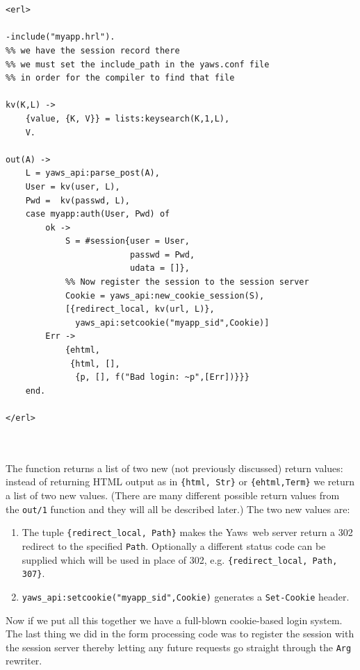 \documentclass[11pt,oneside,english]{book}
\newcommand{\Yaws}            %
        {{\sc Yaws}}
\begin{document}
\begin{verbatim}


<erl>

-include("myapp.hrl").
%% we have the session record there
%% we must set the include_path in the yaws.conf file
%% in order for the compiler to find that file

kv(K,L) ->
    {value, {K, V}} = lists:keysearch(K,1,L),
    V.

out(A) ->
    L = yaws_api:parse_post(A),
    User = kv(user, L),
    Pwd =  kv(passwd, L),
    case myapp:auth(User, Pwd) of
        ok ->
            S = #session{user = User,
                         passwd = Pwd,
                         udata = []},
            %% Now register the session to the session server
            Cookie = yaws_api:new_cookie_session(S),
            [{redirect_local, kv(url, L)},
              yaws_api:setcookie("myapp_sid",Cookie)]
        Err ->
            {ehtml,
             {html, [],
              {p, [], f("Bad login: ~p",[Err])}}}
    end.

</erl>



\end{verbatim}

The function returns a list of two new (not previously discussed)
return values: instead of returning HTML output as in
\verb+{html, Str}+ or \verb+{ehtml,Term}+ we return a list of two new
values. (There are many different possible return values from the
\verb+out/1+ function and they will all be described later.) The two
new values are:

\begin{enumerate}

\item The tuple \verb+{redirect_local, Path}+ makes the \Yaws\ web
  server return a 302 redirect to the specified \verb+Path+.
  Optionally a different status code can be supplied which will be
  used in place of 302, e.g.  \verb+{redirect_local, Path, 307}+.

\item \verb+yaws_api:setcookie("myapp_sid",Cookie)+ generates a
  \verb+Set-Cookie+ header.
\end{enumerate}

Now if we put all this together we have a full-blown cookie-based
login system. The last thing we did in the form processing code was
to register the session with the session server thereby letting any
future requests go straight through the \verb+Arg+ rewriter.
\end{document}
